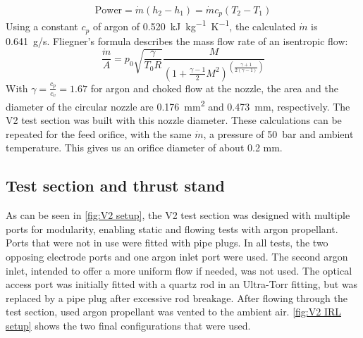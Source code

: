             \[\text{Power} = \dot m (h_2-h_1)
            = \dot m c_p (T_2-T_1)\]
            Using a constant $c_p$ of argon of \qty{0.520}{kJ.kg^{-1}.K^{-1}}, the calculated $\dot m$ is \qty{0.641}{g/s}. Fliegner's formula describes the mass flow rate of an isentropic flow:
            \[\frac{\dot m}{A} = p_0\sqrt{\frac{\gamma}{T_0 R}}\frac{M}{(1+\frac{\gamma-1}{2}M^2)^{(\frac{\gamma+1}{2(\gamma-1)})}}\]
            With $\gamma = \frac{c_p}{c_v} = 1.67$ for argon and choked flow at the nozzle, the area and the diameter of the circular nozzle are \qty{0.176}{mm^2} and \qty{0.473}{mm}, respectively. The V2 test section was built with this nozzle diameter. These calculations can be repeated for the feed orifice, with the same $\dot m$, a pressure of \qty{50}{bar} and ambient temperature. This gives us an orifice diameter of about 0.2 mm.
        
        \subsection{Test section and thrust stand}
            
            As can be seen in \autoref{fig:V2 setup}, the V2 test section was designed with multiple ports for modularity, enabling static and flowing tests with argon propellant. Ports that were not in use were fitted with pipe plugs. In all tests, the two opposing electrode ports and one argon inlet port were used. The second argon inlet, intended to offer a more uniform flow if needed, was not used. The optical access port was initially fitted with a quartz rod in an Ultra-Torr fitting, but was replaced by a pipe plug after excessive rod breakage. After flowing through the test section, used argon propellant was vented to the ambient air. \autoref{fig:V2 IRL setup} shows the two final configurations that were used.

